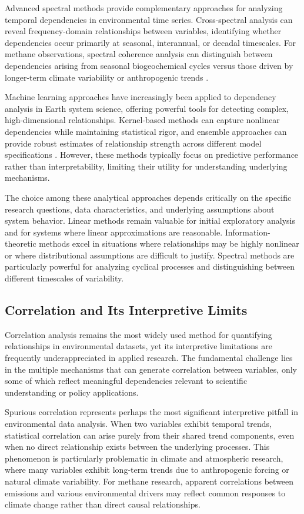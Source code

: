 Advanced spectral methods provide complementary approaches for analyzing temporal dependencies in environmental time series. Cross-spectral analysis can reveal frequency-domain relationships between variables, identifying whether dependencies occur primarily at seasonal, interannual, or decadal timescales. For methane observations, spectral coherence analysis can distinguish between dependencies arising from seasonal biogeochemical cycles versus those driven by longer-term climate variability or anthropogenic trends \cite{tongal_forecasting_2021}.

Machine learning approaches have increasingly been applied to dependency analysis in Earth system science, offering powerful tools for detecting complex, high-dimensional relationships. Kernel-based methods can capture nonlinear dependencies while maintaining statistical rigor, and ensemble approaches can provide robust estimates of relationship strength across different model specifications \cite{Marinazzo2008}. However, these methods typically focus on predictive performance rather than interpretability, limiting their utility for understanding underlying mechanisms.

The choice among these analytical approaches depends critically on the specific research questions, data characteristics, and underlying assumptions about system behavior. Linear methods remain valuable for initial exploratory analysis and for systems where linear approximations are reasonable. Information-theoretic methods excel in situations where relationships may be highly nonlinear or where distributional assumptions are difficult to justify. Spectral methods are particularly powerful for analyzing cyclical processes and distinguishing between different timescales of variability.

\subsection{Correlation and Its Interpretive Limits}

Correlation analysis remains the most widely used method for quantifying relationships in environmental datasets, yet its interpretive limitations are frequently underappreciated in applied research. The fundamental challenge lies in the multiple mechanisms that can generate correlation between variables, only some of which reflect meaningful dependencies relevant to scientific understanding or policy applications.

Spurious correlation represents perhaps the most significant interpretive pitfall in environmental data analysis. When two variables exhibit temporal trends, statistical correlation can arise purely from their shared trend components, even when no direct relationship exists between the underlying processes. This phenomenon is particularly problematic in climate and atmospheric research, where many variables exhibit long-term trends due to anthropogenic forcing or natural climate variability. For methane research, apparent correlations between emissions and various environmental drivers may reflect common responses to climate change rather than direct causal relationships.

